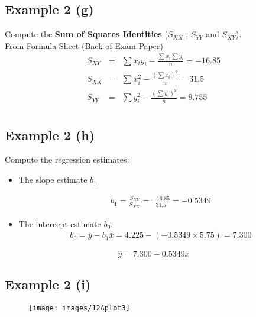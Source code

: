 \documentclass[]{report}
\begin{document}


\subsection{Example 2 (g)}
Compute the \textbf{Sum of Squares Identities} ($S_{XX}$ , $S_{YY}$ and $S_{XY}$).\\
\bigskip
From Formula Sheet (Back of Exam Paper)
\begin{eqnarray*}
	S_{XY} &=&
	\sum x_iy_i - \frac{\sum x_i\sum y_i}{n} = -16.85\\
	S_{XX} &=&
	\sum x_i^2 - \frac{(\sum x_i)^2}{n} = 31.5\\
	S_{YY} &=&
	\sum y_i^2 - \frac{(\sum y_i)^2}{n} = 9.755\\
\end{eqnarray*}



\subsection{Example 2 (h)}
Compute the regression estimates:
\begin{itemize}
	\item  The slope estimate $b_1$
	
	\begin{eqnarray*}
		b_1 = \frac{S_{XY}}{S_{XX}} = \frac{-16.85}{31.5} = -0.5349
	\end{eqnarray*}
	
	\item  The intercept estimate $b_0$.
	\begin{eqnarray*}
		b_0 = \bar{y} -b_1\bar{x} = 4.225 - (-0.5349 \times 5.75) = 7.300
	\end{eqnarray*}
\end{itemize}

\[ \hat{y}  = 7.300 -0.5349 x \]




\subsection{Example 2 (i)}

\begin{figure}
	\texttt{[image: images/12Aplot3]}\\
\end{figure}
\end{document}
